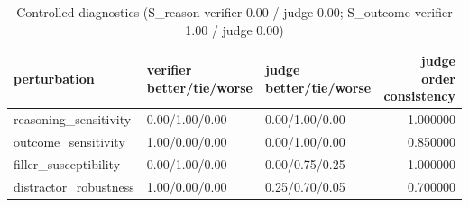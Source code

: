 \begin{table}
\caption{Controlled diagnostics (S_reason verifier 0.00 / judge 0.00; S_outcome verifier 1.00 / judge 0.00)}
\label{tab:t5_diagnostics}
\begin{tabular}{lllr}
\toprule
perturbation & verifier better/tie/worse & judge better/tie/worse & judge order consistency \\
\midrule
reasoning\_sensitivity & 0.00/1.00/0.00 & 0.00/1.00/0.00 & 1.000000 \\
outcome\_sensitivity & 1.00/0.00/0.00 & 0.00/1.00/0.00 & 0.850000 \\
filler\_susceptibility & 0.00/1.00/0.00 & 0.00/0.75/0.25 & 1.000000 \\
distractor\_robustness & 1.00/0.00/0.00 & 0.25/0.70/0.05 & 0.700000 \\
\bottomrule
\end{tabular}
\end{table}
